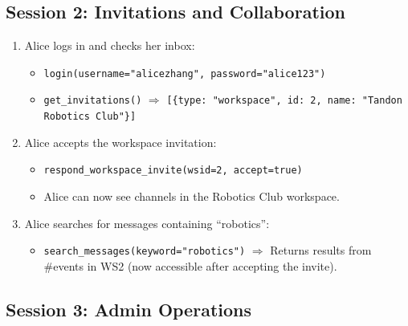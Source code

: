 \documentclass[11pt]{article}
\begin{document}
\subsection{Session 2: Invitations and Collaboration}

\begin{enumerate}
    \item Alice logs in and checks her inbox:
    \begin{itemize}
        \item \texttt{login(username="alicezhang", password="alice123")}
        \item \texttt{get\_invitations()} $\Rightarrow$ \texttt{[\{type: "workspace", id: 2, name: "Tandon Robotics Club"\}]}
    \end{itemize}

    \item Alice accepts the workspace invitation:
    \begin{itemize}
        \item \texttt{respond\_workspace\_invite(wsid=2, accept=true)}
        \item Alice can now see channels in the Robotics Club workspace.
    \end{itemize}

    \item Alice searches for messages containing ``robotics'':
    \begin{itemize}
        \item \texttt{search\_messages(keyword="robotics")} $\Rightarrow$ Returns results from \#events in WS2 (now accessible after accepting the invite).
    \end{itemize}
\end{enumerate}

\subsection{Session 3: Admin Operations}
\end{document}
